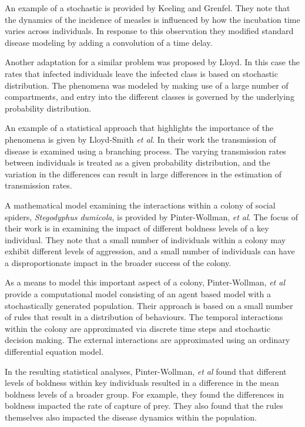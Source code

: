 \documentclass[12pt]{article}
\begin{document}
An example of a stochastic is provided by Keeling and
Grenfel\cite{Keeling65}. They note that the dynamics of the incidence
of measles is influenced by how the incubation time varies across
individuals. In response to this observation they modified standard
disease modeling by adding a convolution of a time delay.


Another adaptation for a similar problem was proposed by
Lloyd\cite{doi:10.1098/rspb.2001.1599}. In this case the rates that
infected individuals leave the infected class is based on stochastic
distribution. The phenomena was modeled by making use of a large
number of compartments, and entry into the different classes is
governed by the underlying probability distribution.

An example of a statistical approach that highlights the importance of
the phenomena is given by Lloyd-Smith \textit{et
  al}\cite{SuperspreadingLloyd}. In their work the transmission of
disease is examined using a branching process. The varying
transmission rates between individuals is treated as a given
probability distribution, and the variation in the differences can
result in large differences in the estimation of transmission rates.

A mathematical model examining the interactions within a colony of
social spiders, \textit{Stegodyphus dumicola}, is provided by
Pinter-Wollman, \textit{et al}\cite{doi:10.1086/687235}. The focus of
their work is in examining the impact of different boldness levels of
a key individual.  They note that a small number of individuals within
a colony may exhibit different levels of aggression, and a small
number of individuals can have a disproportionate impact in the
broader success of the colony.

As a means to model this important aspect of a colony, Pinter-Wollman,
\textit{et al}\cite{doi:10.1086/687235} provide a computational model
consisting of an agent based model with a stochastically generated
population. Their approach is based on a small number of rules that
result in a distribution of behaviours. The temporal interactions
within the colony are approximated via discrete time steps and
stochastic decision making. The external interactions are approximated
using an ordinary differential equation model.

In the resulting statistical analyses, Pinter-Wollman, \textit{et
  al}\cite{doi:10.1086/687235} found that different levels of boldness
within key individuals resulted in a difference in the mean boldness
levels of a broader group. For example, they found the differences in
boldness impacted the rate of capture of prey. They also found that
the rules themselves also impacted the disease dynamics within the
population.
\end{document}
